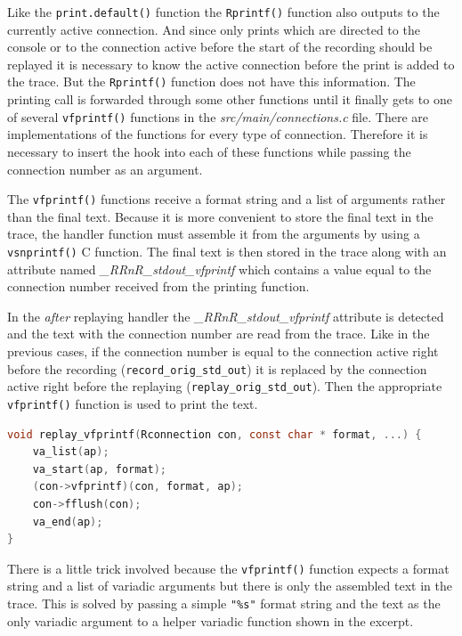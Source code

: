 \documentclass[thesis=M,english,hidelinks]{FITthesis}[2012/10/20]
\begin{document}
			Like the \lstinline|print.default()| function the \lstinline|Rprintf()| function also outputs to the currently active connection. And since only prints which are directed to the console or to the connection active before the start of the recording should be replayed it is necessary to know the active connection before the print is added to the trace. But the \lstinline|Rprintf()| function does not have this information. The printing call is forwarded through some other functions until it finally gets to one of several \lstinline|vfprintf()| functions in the \emph{src/main/connections.c} file. There are implementations of the functions for every type of connection. Therefore it is necessary to insert the hook into each of these functions while passing the connection number as an argument.\par
			
			The \lstinline|vfprintf()| functions receive a format string and a list of arguments rather than the final text. Because it is more convenient to store the final text in the trace, the handler function must assemble it from the arguments by using a \lstinline|vsnprintf()| C function. The final text is then stored in the trace along with an attribute named \emph{\_RRnR\_stdout\_vfprintf} which contains a value equal to the connection number received from the printing function.\par
			
			In the \emph{after} replaying handler the \emph{\_RRnR\_stdout\_vfprintf} attribute is detected and the text with the connection number are read from the trace. Like in the previous cases, if the connection number is equal to the connection active right before the recording (\lstinline|record_orig_std_out|) it is replaced by the connection active right before the replaying (\lstinline|replay_orig_std_out|). Then the appropriate \lstinline|vfprintf()| function is used to print the text.\par
			
\begin{lstlisting}[style=filestyle, language=C, caption={Replaying the \lstinline|vfprintf()| function using a helper function}]
void replay_vfprintf(Rconnection con, const char * format, ...) {
	va_list(ap);
	va_start(ap, format);
	(con->vfprintf)(con, format, ap);
	con->fflush(con);
	va_end(ap);
}
\end{lstlisting}

			There is a little trick involved because the \lstinline|vfprintf()| function expects a format string and a list of variadic arguments but there is only the assembled text in the trace. This is solved by passing a simple \lstinline|"%s"| format string and the text as the only variadic argument to a helper variadic function shown in the excerpt.\par
			
\end{document}
